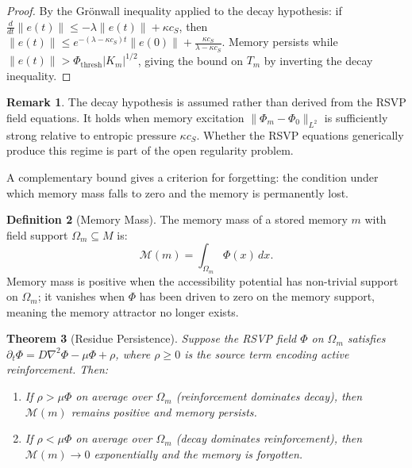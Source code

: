 \documentclass[12pt, oneside]{book}
\theoremstyle{flyxion}
\newtheorem{theorem}{Theorem}[chapter]
\theoremstyle{definition}
\newtheorem{definition}[theorem]{Definition}
\newtheorem{remark}[theorem]{Remark}
\begin{document}
\begin{proof}
By the Gr\"onwall inequality applied to the decay
hypothesis: if $\frac{d}{dt}\|e(t)\| \leq
-\lambda\|e(t)\| + \kappa c_S$, then
$\|e(t)\| \leq e^{-(\lambda - \kappa c_S)t}\|e(0)\| +
\frac{\kappa c_S}{\lambda - \kappa c_S}$.
Memory persists while $\|e(t)\| > \Phi_\mathrm{thresh}
|K_m|^{1/2}$, giving the bound on $T_m$ by inverting
the decay inequality.
\end{proof}

\begin{remark}
The decay hypothesis is assumed rather than derived
from the RSVP field equations. It holds when memory
excitation $\|\Phi_m - \Phi_0\|_{L^2}$ is sufficiently
strong relative to entropic pressure $\kappa c_S$.
Whether the RSVP equations generically produce this
regime is part of the open regularity problem.
\end{remark}

A complementary bound gives a criterion for forgetting:
the condition under which memory mass falls to zero and
the memory is permanently lost.

\begin{definition}[Memory Mass]
The memory mass of a stored memory $m$ with field
support $\Omega_m \subseteq M$ is:
\[
\mathcal{M}(m) = \int_{\Omega_m} \Phi(x)\,dx.
\]
Memory mass is positive when the accessibility potential
has non-trivial support on $\Omega_m$; it vanishes when
$\Phi$ has been driven to zero on the memory support,
meaning the memory attractor no longer exists.
\end{definition}

\begin{theorem}[Residue Persistence]
\label{thm:residue_persistence}
Suppose the RSVP field $\Phi$ on $\Omega_m$ satisfies
$\partial_t\Phi = D\nabla^2\Phi - \mu\Phi + \rho$,
where $\rho \geq 0$ is the source term encoding active
reinforcement. Then:
\begin{enumerate}
\item[(i)] If $\rho > \mu\Phi$ on average over $\Omega_m$
   (reinforcement dominates decay), then $\mathcal{M}(m)$
   remains positive and memory persists.
\item[(ii)] If $\rho < \mu\Phi$ on average over $\Omega_m$
   (decay dominates reinforcement), then $\mathcal{M}(m)
   \to 0$ exponentially and the memory is forgotten.
\end{enumerate}
\end{theorem}
\end{document}
